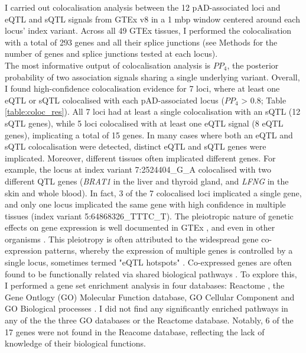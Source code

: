 I carried out colocalisation analysis between the 12 pAD-associated loci and eQTL and sQTL signals from GTEx v8 in a 1 mbp window centered around each locus' index variant. Across all 49 GTEx tissues, I performed the colocalisation with a total of 293 genes and all their splice junctions (see Methods for the number of genes and splice junctions tested at each locus).\\

The most informative output of colocalisation analysis is $PP_{4}$, the posterior probability of two association signals sharing a single underlying variant. Overall, I found high-confidence colocalisation evidence for 7 loci, where at least one eQTL or sQTL colocalised with each pAD-associated locus ($PP_{4}$ > 0.8; Table \ref{table:coloc_res}). All 7 loci had at least a single colocalisation with an sQTL (12 sQTL genes), while 5 loci colocalised with at least one eQTL signal (8 eQTL genes), implicating a total of 15 genes. In many cases where both an eQTL and sQTL colocalisation were detected, distinct eQTL and sQTL genes were implicated. Moreover, different tissues often implicated different genes. For example, the locus at index variant 7:2524404\_G\_A colocalised with two different QTL genes (\textit{BRAT1} in the liver and thyroid gland, and \textit{LFNG} in the skin and whole blood). In fact, 3 of the 7 colocalised loci implicated a single gene, and only one locus implicated the same gene with high confidence in multiple tissues (index variant 5:64868326\_TTTC\_T). The pleiotropic nature of genetic effects on gene expression is well documented in GTEx \cite{Ribeiro2021-xj}, and even in other organisms \cite{Brem2002-zj,Schadt2003-ei}. This pleiotropy is often attributed to the widespread gene co-expression patterns, whereby the expression of multiple genes is controlled by a single locus, sometimes termed "eQTL hotspots" \cite{Tian2016-hy}. Co-expressed genes are often found to be functionally related via shared biological pathways \cite{Van_Dam2017-vm,Westra2013-mm}. To explore this, I performed a gene set enrichment analysis in four databases: Reactome \cite{Gillespie2022-jr}, the Gene Ontlogy (GO) Molecular Function database, GO Cellular Component and GO Biological processes \cite{Thomas2022-nb}. I did not find any significantly enriched pathways in any of the the three GO databases or the Reactome database. Notably, 6 of the 17 genes were not found in the Reacome database, reflecting the lack of knowledge of their biological functions. 


